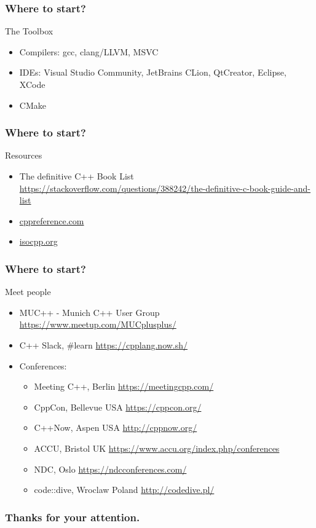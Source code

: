 \documentclass[aspectratio=43]{beamer}
\begin{document}
\begin{frame}
  \frametitle{Where to start?}
  The Toolbox
  \pause
  \begin{itemize}[<+->]
  \item Compilers: gcc, clang/LLVM, MSVC
  \item IDEs: Visual Studio Community, JetBrains CLion, QtCreator, Eclipse, XCode
  \item CMake
  \end{itemize}
\end{frame}

\begin{frame}
  \frametitle{Where to start?}
  Resources
  \pause
  \begin{itemize}[<+->]
  \item The definitive C++ Book List
    \href{https://stackoverflow.com/questions/388242/the-definitive-c-book-guide-and-list}{https://stackoverflow.com/questions/388242/the-definitive-c-book-guide-and-list}
    \item \href{http://en.cppreference.com/w/}{cppreference.com}
    \item \href{https://isocpp.org/}{isocpp.org}
  \end{itemize}
\end{frame}

\begin{frame}
  \frametitle{Where to start?}
  Meet people
  \pause
  \begin{itemize}[<+->]
  \item MUC++ - Munich C++ User Group \href{https://www.meetup.com/MUCplusplus/}{https://www.meetup.com/MUCplusplus/}
  \item C++ Slack, \#learn \href{https://cpplang.now.sh/}{https://cpplang.now.sh/}
  \item Conferences:
  \begin{itemize}
    \item Meeting C++, Berlin \href{https://meetingcpp.com/}{https://meetingcpp.com/}
    \item CppCon, Bellevue USA \href{https://cppcon.org/}{https://cppcon.org/}
    \item C++Now, Aspen USA \href{http://cppnow.org/}{http://cppnow.org/}
    \item ACCU, Bristol UK \href{https://www.accu.org/index.php/conferences}{https://www.accu.org/index.php/conferences}
    \item NDC, Oslo \href{https://ndcconferences.com/}{https://ndcconferences.com/}
    \item code::dive, Wroclaw Poland \href{http://codedive.pl/}{http://codedive.pl/}
  \end{itemize}
  \end{itemize}
\end{frame}

\begin{frame}
  \frametitle{Thanks for your attention.}
\end{frame}
\end{document}

